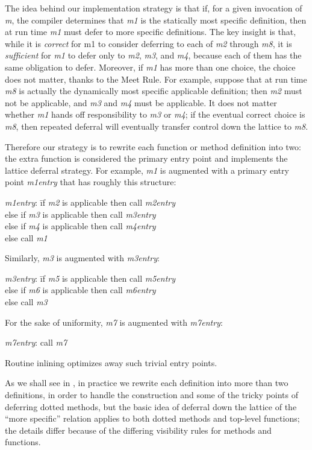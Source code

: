 The idea behind our implementation strategy is that if, for a given invocation of \emph{m},
the compiler determines that \emph{m1} is the statically most specific definition,
then at run time \emph{m1} must defer to more specific definitions.  The key insight is that,
while it is \emph{correct} for m1 to consider deferring to each of \emph{m2} through \emph{m8},
it is \emph{sufficient} for \emph{m1} to defer only to \emph{m2}, \emph{m3}, and \emph{m4}, because each of them
has the same obligation to defer.  Moreover, if \emph{m1} has more than one choice,
the choice does not matter, thanks to the Meet Rule.  For example, suppose that
at run time \emph{m8} is actually the dynamically most specific applicable definition;
then \emph{m2} must not be applicable, and \emph{m3} and \emph{m4} must be applicable.  It does not matter
whether \emph{m1} hands off responsibility to \emph{m3} or \emph{m4}; if the eventual correct choice is \emph{m8},
then repeated deferral will eventually transfer control down the lattice to \emph{m8}.

Therefore our strategy is to rewrite each function or method definition into two:
the extra function is considered the primary entry point and implements the lattice deferral strategy.
For example, \emph{m1} is augmented with a primary entry point \emph{m1entry} that has roughly this structure:
\begin{tabbing}
\emph{m1entry}: \= if \emph{m2} is applicable then call \emph{m2entry} \\
\>else if \emph{m3} is applicable then call \emph{m3entry} \\
\>else if \emph{m4} is applicable then call \emph{m4entry} \\
\>else call \emph{m1}
\end{tabbing}
Similarly, \emph{m3} is augmented with \emph{m3entry}:
\begin{tabbing}
\emph{m3entry}: \= if \emph{m5} is applicable then call \emph{m5entry} \\
\>else if \emph{m6} is applicable then call \emph{m6entry} \\
\>else call \emph{m3}
\end{tabbing}
For the sake of uniformity, \emph{m7} is augmented with \emph{m7entry}:
\begin{tabbing}
\emph{m7entry}: call \emph{m7}
\end{tabbing}
Routine inlining optimizes away such trivial entry points.

As we shall see in ,
in practice we rewrite each definition into more than two definitions,
in order to handle the  construction and some of the tricky points of
deferring dotted methods, but the basic idea of deferral down the lattice
of the ``more specific'' relation applies to both dotted methods
and top-level functions; the details differ because of the differing visibility
rules for methods and functions.


